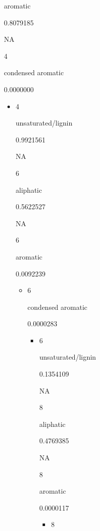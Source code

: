 \documentclass[
]{article}
\begin{document}
\begin{itemize}
\begin{itemize}
\begin{itemize}
\begin{itemize}
\begin{itemize}
\begin{itemize}
\begin{itemize}
\begin{itemize}
                aromatic

                0.8079185

                NA

                4

                condensed aromatic

                0.0000000

                \begin{itemize}
                \item
                  4

                  unsaturated/lignin

                  0.9921561

                  NA

                  6

                  aliphatic

                  0.5622527

                  NA

                  6

                  aromatic

                  0.0092239

                  \begin{itemize}
                  \item
                    6

                    condensed aromatic

                    0.0000283

                    \begin{itemize}
                    \item
                      6

                      unsaturated/lignin

                      0.1354109

                      NA

                      8

                      aliphatic

                      0.4769385

                      NA

                      8

                      aromatic

                      0.0000117

                      \begin{itemize}
                      \item
                        8


\end{itemize}
\end{itemize}
\end{itemize}
\end{itemize}
\end{itemize}
\end{itemize}
\end{itemize}
\end{itemize}
\end{itemize}
\end{itemize}
\end{itemize}
\end{itemize}
\end{document}
